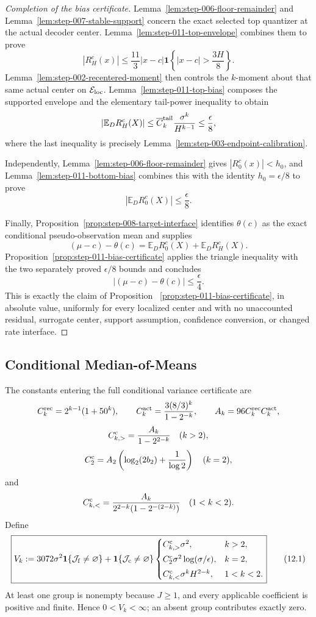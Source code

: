 \begin{proof}[Completion of the bias certificate]
Lemma~\ref{lem:step-006-floor-remainder} and
Lemma~\ref{lem:step-007-stable-support} concern the exact selected top
quantizer at the actual decoder center. Lemma~\ref{lem:step-011-top-envelope}
combines them to prove
\[
|R_H^c(x)|
\leq\frac{11}{3}|x-c|
\mathbf1\left\{|x-c|>\frac{3H}{8}\right\}.
\]
Lemma~\ref{lem:step-002-recentered-moment} then controls the
\(k\)-moment about that same actual center on \(\mathcal E_{\rm loc}\).
Lemma~\ref{lem:step-011-top-bias} composes the supported envelope and
the elementary tail-power inequality to obtain
\[
|\mathbb E_D R_H^c(X)|
\leq\overline C_k^{\rm tail}\frac{\sigma^k}{H^{k-1}}
\leq\frac\epsilon8,
\]
where the last inequality is precisely Lemma~\ref{lem:step-003-endpoint-calibration}.

Independently, Lemma~\ref{lem:step-006-floor-remainder} gives
\(|R_0^c(x)|<h_0\), and
Lemma~\ref{lem:step-011-bottom-bias} combines this with the identity \(h_0=\epsilon/8\) to prove
\[
|\mathbb E_D R_0^c(X)|\leq\frac\epsilon8.
\]

Finally, Proposition~\ref{prop:step-008-target-interface}
identifies \(\theta(c)\) as the exact conditional pseudo-observation mean and
supplies
\[
(\mu-c)-\theta(c)
=\mathbb E_D R_0^c(X)+\mathbb E_D R_H^c(X).
\]
Proposition~\ref{prop:step-011-bias-certificate} applies the triangle
inequality with the two separately proved \(\epsilon/8\) bounds and concludes
\[
\left|(\mu-c)-\theta(c)\right|\leq\frac\epsilon4.
\]
This is exactly the claim of Proposition~
\ref{prop:step-011-bias-certificate}, in absolute value, uniformly for every
localized center and with no unaccounted residual, surrogate center,
support assumption, confidence conversion, or changed rate interface.
\end{proof}

\subsection{Conditional Median-of-Means}\label{app:step-012}

The constants entering the full conditional variance certificate are
\[
C_k^{\rm rec}=2^{k-1}(1+50^k),\qquad
C_k^{\rm act}=\frac{3(8/3)^k}{1-2^{-k}},\qquad
A_k=96C_k^{\rm rec}C_k^{\rm act},
\]
\[
C_{k,>}^{\rm c}=\frac{A_k}{1-2^{2-k}}\quad(k>2),
\]
\[
C_2^{\rm c}
=A_2\left(\log_2(2b_2)+\frac1{\log2}\right)\quad(k=2),
\]
and
\[
C_{k,<}^{\rm c}
=\frac{A_k}{2^{2-k}(1-2^{-(2-k)})}\quad(1<k<2).
\]
Define
\[
\boxed{
V_k
:=
3072\sigma^2\mathbf 1\{\mathcal J_{\rm f}\neq\varnothing\}
+
\mathbf 1\{\mathcal J_{\rm c}\neq\varnothing\}
\begin{cases}
C_{k,>}^{\rm c}\sigma^2, & k>2,\\[0.3em]
C_2^{\rm c}\sigma^2\log(\sigma/\epsilon), & k=2,\\[0.3em]
C_{k,<}^{\rm c}\sigma^kH^{2-k}, & 1<k<2.
\end{cases}
}
\tag{12.1}
\]
At least one group is nonempty because \(J\geq1\), and every applicable
coefficient is positive and finite.  Hence \(0<V_k<\infty\); an absent
group contributes exactly zero.

